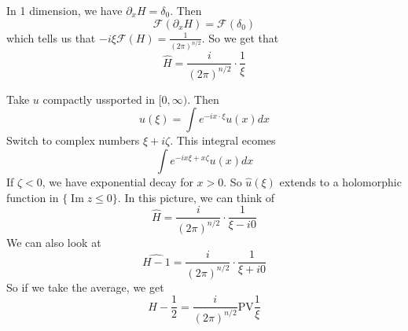 In 1 dimension, we have $\partial_{x} H=\delta_{0}$. Then
$$
\mathcal{F}\left(\partial_{x} H\right)=\mathcal{F}\left(\delta_{0}\right)
$$
which tells us that $-i \xi \mathcal{F}(H)=\frac{1}{(2 \pi)^{n / 2}}$. So we get that
$$
\widehat{H}=\frac{i}{(2 \pi)^{n / 2}} \cdot \frac{1}{\xi}
$$

Take $u$ compactly ussported in $[0, \infty)$. Then
$$
\widehat{u}(\xi)=\int e^{-i x \cdot \xi} u(x) d x
$$
Switch to complex numbers $\xi+i \zeta .$ This integral ecomes
$$
\int e^{-i x \xi+x \zeta} u(x) d x
$$
If $\zeta<0$, we have exponential decay for $x>0 .$ So $\widehat{u}(\xi)$ extends to a holomorphic function in $\{\operatorname{Im} z \leq 0\}$.
In this picture, we can think of
$$
\widehat{H}=\frac{i}{(2 \pi)^{n / 2}} \cdot \frac{1}{\xi-i 0}
$$
We can also look at
$$
\widehat{H-1}=\frac{i}{(2 \pi)^{n / 2}} \cdot \frac{1}{\xi+i 0}
$$
So if we take the average, we get
$$
H-\frac{1}{2}=\frac{i}{(2 \pi)^{n / 2}} \mathrm{PV} \frac{1}{\xi}
$$